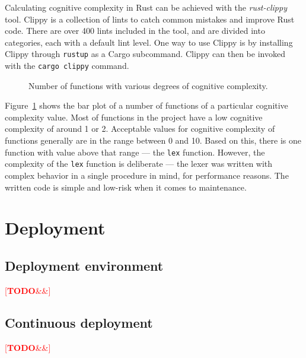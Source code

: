 \documentclass[english,engineering]{wizthesis}
\newcommand{\todo}[1]{%
  \textcolor{red}{[\textbf{TODO}\ifx&#1&{}\else{ }\fi\emph{#1}]}%
}
\begin{document}
Calculating cognitive complexity in Rust can be achieved with the
\emph{rust-clippy} tool. Clippy is a collection of lints to catch common
mistakes and improve Rust code. There are over 400 lints included in the tool,
and are divided into categories, each with a default lint level. One way to use
Clippy is by installing Clippy through \texttt{rustup} as a Cargo subcommand.
Clippy can then be invoked with the \texttt{cargo clippy} command.

\begin{figure}[H]
  \centering
  
  \caption{Number of functions with various degrees of cognitive complexity.}
  \label{fig:cognitive-complexity}
\end{figure}

Figure~\ref{fig:cognitive-complexity} shows the bar plot of a number of
functions of a particular cognitive complexity value. Most of functions in the
project have a low cognitive complexity of around 1 or 2. Acceptable values for
cognitive complexity of functions generally are in the range between 0 and 10.
Based on this, there is one function with value above that range --- the
\texttt{lex} function. However, the complexity of the \texttt{lex} function is
deliberate --- the lexer was written with complex behavior in a single procedure
in mind, for performance reasons. The written code is simple and low-risk when
it comes to maintenance.

\newpage

\chapter{Deployment}

\section{Deployment environment}

\todo{}

\section{Continuous deployment}


\todo{}
\end{document}
